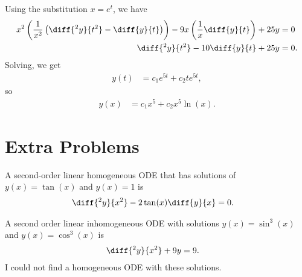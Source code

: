 \documentclass[12pt]{mypackage}
\begin{document}
\begin{solution}[4.7, Problem 32]
  Using the substitution $x = e^t$, we have
  \begin{align*}
    x^2 \left( \frac{1}{x^2}\left( \diff{^2y}{t^2} - \diff{y}{t} \right) \right) - 9x\left( \frac{1}{x}\diff{y}{t} \right) + 25y &= 0\\
    \diff{^2y}{t^2} - 10\diff{y}{t} + 25y &= 0.
  \end{align*}
  Solving, we get
  \begin{align*}
    y(t) &= c_1e^{5t} + c_2te^{5t},
  \end{align*}
  so
  \begin{align*}
    y(x) &= c_1x^5 + c_2x^5\ln(x).
  \end{align*}
\end{solution}
\section{Extra Problems}%
\begin{solution}
  A second-order linear homogeneous ODE that has solutions of $y(x) = \tan(x)$ and $y(x) = 1$ is
  \begin{align*}
    \diff{^2y}{x^2} - 2\tan(x)\diff{y}{x} &= 0.
  \end{align*}
\end{solution}
\begin{solution}
  A second order linear inhomogeneous ODE with solutions $y(x) = \sin^3(x)$ and $y(x) = \cos^3(x)$ is
  \begin{align*}
    \diff{^2y}{x^2} + 9y &= 9.
  \end{align*}
  I could not find a homogeneous ODE with these solutions.
\end{solution}
\end{document}
